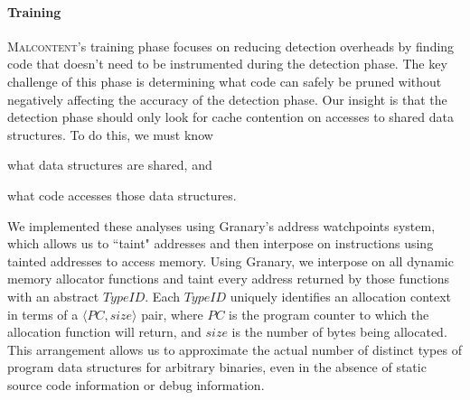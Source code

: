 \documentclass[letterpaper,twocolumn,10pt]{article}
\newcommand{\TextToolname}{Malcontent}
\newcommand{\Toolname}{\textsc{\TextToolname{}}}
\begin{document}
\paragraph{Training}
%

\Toolname's training phase focuses on reducing detection overheads by finding code that doesn't need to be instrumented
during the detection phase. The key challenge of this phase is determining what code can safely be pruned without negatively
affecting the accuracy of the detection phase. Our insight is that the detection phase should only look for cache contention
on accesses to shared data structures. To do this, we must know \begin{inparaenum}
\item what data structures are shared, and
\item what code accesses those data structures.
\end{inparaenum}

\newcommand\TypeId{$TypeID$}
\newcommand\TypeIdPair{$\langle PC,size \rangle$ }

We implemented these analyses using Granary's address watchpoints \cite{AddressWatchpoints} system, which allows us to
``taint" addresses and then interpose on instructions using tainted addresses to access memory. Using Granary, we interpose on
all dynamic memory allocator functions and taint every address returned by those functions with an abstract \TypeId{}.
Each \TypeId{} uniquely identifies an allocation context in terms of a \TypeIdPair{} pair, where $PC$ is the program counter
to which the allocation function will return, and $size$ is the number of bytes being allocated. This arrangement allows us to
approximate the actual number of distinct types of program data structures for arbitrary binaries, even in the absence of
static source code information or debug information.
\end{document}
